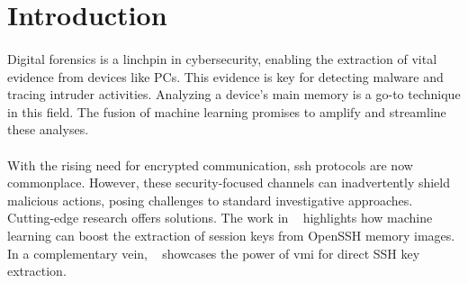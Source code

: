 \section{Introduction}\label{chap:introduction}

\begin{comment}
Motivate your research and outline the research gap in this chapter. Why is your thesis relevant and what do you address, what has not been addressed before. 

General Requirements to the thesis:

\begin{itemize}
	\item 60 pages of content in this format. Content does not include table of content, lists, appendices etc.
	\item Proper scientific referencing
	\item Introduction and Background should be less than 50\% of the thesis
	\item Images should be readable and in the proper size. 
\end{itemize}
\end{comment}


\paragraph*{}Digital forensics is a linchpin in cybersecurity, enabling the extraction of vital evidence from devices like PCs. This evidence is key for detecting malware and tracing intruder activities. Analyzing a device's main memory is a go-to technique in this field. The fusion of machine learning promises to amplify and streamline these analyses.
 
\paragraph*{}With the rising need for encrypted communication, \acrfull{ssh} protocols are now commonplace. However, these security-focused channels can inadvertently shield malicious actions, posing challenges to standard investigative approaches. Cutting-edge research offers solutions. The work in ~\cite*{fellicious_smartkex_2022} highlights how machine learning can boost the extraction of session keys from OpenSSH memory images. In a complementary vein, ~\cite*{sentanoe_sshkex_2022} showcases the power of \acrfull{vmi} for direct SSH key extraction.


